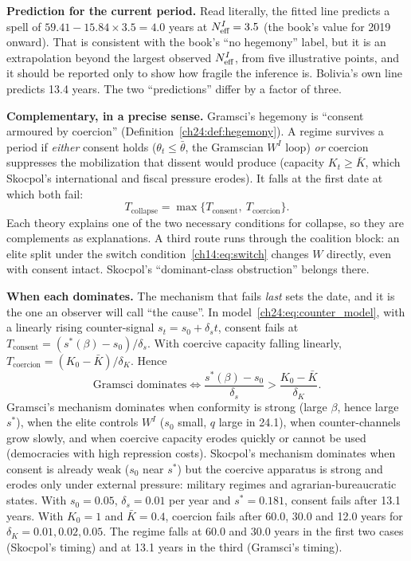 \documentclass[../solutions_manual.tex]{subfiles}
\begin{document}
 \textbf{Prediction for the current period.} Read literally, the fitted line predicts a spell of $59.41 - 15.84 \times 3.5 = 4.0$ years at $N_{\text{eff}}^I = 3.5$ (the book's value for 2019 onward). That is consistent with the book's ``no hegemony'' label, but it is an extrapolation beyond the largest observed $N_{\text{eff}}^I$, from five illustrative points, and it should be reported only to show how fragile the inference is. Bolivia's own line predicts 13.4 years. The two ``predictions'' differ by a factor of three.


 \textbf{Complementary, in a precise sense.} Gramsci's hegemony is ``consent armoured by coercion'' (Definition~\ref{ch24:def:hegemony}). A regime survives a period if \emph{either} consent holds ($\theta_t \le \bar\theta$, the Gramscian $W^I$ loop) \emph{or} coercion suppresses the mobilization that dissent would produce (capacity $K_t \ge \bar K$, which Skocpol's international and fiscal pressure erodes). It falls at the first date at which both fail:
\[
T_{\text{collapse}} = \max\{T_{\text{consent}},\ T_{\text{coercion}}\}.
\]
Each theory explains one of the two necessary conditions for collapse, so they are complements as explanations. A third route runs through the coalition block: an elite split under the switch condition~\eqref{ch14:eq:switch} changes $W$ directly, even with consent intact. Skocpol's ``dominant-class obstruction'' belongs there.

 \textbf{When each dominates.} The mechanism that fails \emph{last} sets the date, and it is the one an observer will call ``the cause''. In model~\eqref{ch24:eq:counter_model}, with a linearly rising counter-signal $s_t = s_0 + \delta_s t$, consent fails at $T_{\text{consent}} = (s^*(\beta) - s_0)/\delta_s$. With coercive capacity falling linearly, $T_{\text{coercion}} = (K_0 - \bar K)/\delta_K$. Hence
\[
\text{Gramsci dominates} \iff \frac{s^*(\beta) - s_0}{\delta_s} > \frac{K_0 - \bar K}{\delta_K}.
\]
Gramsci's mechanism dominates when conformity is strong (large $\beta$, hence large $s^*$), when the elite controls $W^I$ ($s_0$ small, $q$ large in 24.1), when counter-channels grow slowly, and when coercive capacity erodes quickly or cannot be used (democracies with high repression costs). Skocpol's mechanism dominates when consent is already weak ($s_0$ near $s^*$) but the coercive apparatus is strong and erodes only under external pressure: military regimes and agrarian-bureaucratic states. With $s_0 = 0.05$, $\delta_s = 0.01$ per year and $s^* = 0.181$, consent fails after 13.1 years. With $K_0 = 1$ and $\bar K = 0.4$, coercion fails after 60.0, 30.0 and 12.0 years for $\delta_K = 0.01, 0.02, 0.05$. The regime falls at 60.0 and 30.0 years in the first two cases (Skocpol's timing) and at 13.1 years in the third (Gramsci's timing).
\end{document}
